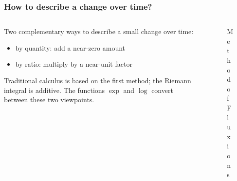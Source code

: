 \documentclass[aspectratio=169]{beamer}
\begin{document}
\begin{frame}
    \frametitle{How to describe a change over time?}
    \begin{columns}
        \begin{column}{0.7\textwidth}
            Two complementary ways to describe a small change over time:
            \begin{itemize}
                \item by quantity: add a near-zero amount
                \item by ratio: multiply by a near-unit factor
            \end{itemize}
            Traditional calculus is based on the first method; the Riemann integral is additive.
            The functions $\exp$ and $\log$ convert between these two viewpoints.
        \end{column}
        \begin{column}{0.3\textwidth}
            \begin{figure}[ht]\centering
            \caption{Method of Fluxions}
            \end{figure}
        \end{column}
    \end{columns}
\end{frame}
\end{document}
